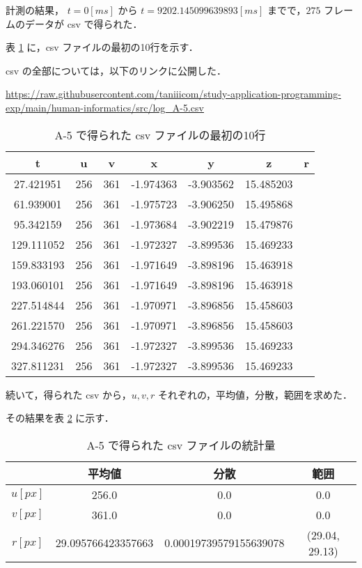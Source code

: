 \documentclass[fleqn, a4paper. 12pt]{jsarticle}
\begin{document}
        計測の結果， $t = 0 [ms]$ から $t = 9202.145099639893 [ms]$ までで，$275$ フレームのデータが csv で得られた．

        表 \ref{table:1} に，csv ファイルの最初の10行を示す．

        csv の全部については，以下のリンクに公開した．

        \url{https://raw.githubusercontent.com/taniiicom/study-application-programming-exp/main/human-informatics/src/log_A-5.csv}

        \begin{table}[ht]
          \centering
          \caption{A-5 で得られた csv ファイルの最初の10行}
          \label{table:1}
          \begin{tabular}{ccccccc}
          \hline
          t & u & v & x & y & z & r \\
          \hline
          27.421951 & 256 & 361 & -1.974363 & -3.903562 & 15.485203 \\
          61.939001 & 256 & 361 & -1.975723 & -3.906250 & 15.495868 \\
          95.342159 & 256 & 361 & -1.973684 & -3.902219 & 15.479876 \\
          129.111052 & 256 & 361 & -1.972327 & -3.899536 & 15.469233 \\
          159.833193 & 256 & 361 & -1.971649 & -3.898196 & 15.463918 \\
          193.060101 & 256 & 361 & -1.971649 & -3.898196 & 15.463918 \\
          227.514844 & 256 & 361 & -1.970971 & -3.896856 & 15.458603 \\
          261.221570 & 256 & 361 & -1.970971 & -3.896856 & 15.458603 \\
          294.346276 & 256 & 361 & -1.972327 & -3.899536 & 15.469233 \\
          327.811231 & 256 & 361 & -1.972327 & -3.899536 & 15.469233 \\
          \hline
          \end{tabular}
        \end{table}

        続いて，得られた csv から，$u, v, r$ それぞれの，平均値，分散，範囲を求めた．

        その結果を表 \ref{table:2} に示す．

        \begin{table}[ht]
          \centering
          \caption{A-5 で得られた csv ファイルの統計量}
          \label{table:2}
          \begin{tabular}{cccc}
          \hline
          & 平均値 & 分散 & 範囲 \\
          \hline
          \( u [px]\) & 256.0 & 0.0 & 0.0 \\
          \( v [px]\) & 361.0 & 0.0 & 0.0 \\
          \( r [px]\) & 29.095766423357663 & 0.00019739579155639078 & (29.04, 29.13) \\
          \hline
          \end{tabular}
        \end{table}
\end{document}

